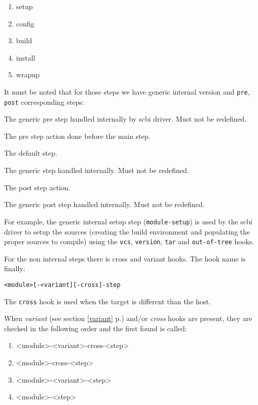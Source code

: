 \documentclass[a4paper,12pt,twoside]{article}
\newcommand{\code}[1]{\texttt{#1}}
\renewcommand{\emph}[1]{\textit{#1}}
\newcommand{\seeref}[1]{see section \ref{#1} p.\pageref{#1}}
\begin{document}
\begin{enumerate}
	\item setup
	\item config
	\item build
	\item install
	\item wrapup
\end{enumerate}

It must be noted that for those steps we have generic internal version and \code{pre}, \code{post} corresponding steps:

\begin{description}[font=\texttt,style=nextline]
	\item[module-pre-<step>] The generic pre step handled internally by scbi driver. Must not be redefined.
	\item[<module>-pre-<step>] The pre step action done before the main step.
	\item[<module>-<step>] The default step.
	\item[module-<step>] The generic step handled internally. Must not be redefined.
	\item[<module>-post-<step>] The post step action.
	\item[module-post-<step>] The generic post step handled internally. Must not be redefined.
\end{description}

For example, the generic internal setup step (\code{module-setup}) is used by the scbi driver to setup the sources (creating the build environment and populating the proper sources to compile) using the \code{vcs}, \code{version}, \code{tar} and \code{out-of-tree} hooks.

For the non internal steps there is cross and variant hooks. The hook name is finally:

\code{<module>[-<variant][-cross]-step}

The \code{cross} hook is used when the target is different than the host.

When \emph{variant} (\seeref{variant}) and/or \emph{cross} hooks are present, they are checked in the following order and the first found is called:

\begin{enumerate}
	\item <module>-<variant>-cross-<step>
	\item <module>-cross-<step>
	\item <module>-<variant>-<step>
	\item <module>-<step>
\end{enumerate}
\end{document}
